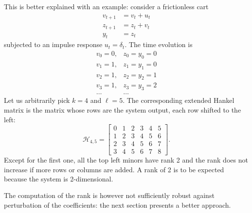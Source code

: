 This is better explained with an example: consider a frictionless cart
\begin{equation*}
  \begin{aligned}
    v_{t+1} &= v_t + u_t \\
    z_{t+1} &= z_t + v_t \\
    y_t &= z_t
  \end{aligned}
\end{equation*}
subjected to an impulse response $u_t=\delta_t$. The time evolution is
\begin{equation*}
  \begin{matrix}
    v_0 = 0, & z_0 = y_0 = 0 \\
    v_1 = 1, & z_1 = y_1 = 0 \\
    v_2 = 1, & z_2 = y_2 = 1 \\
    v_3 = 1, & z_3 = y_3 = 2 \\
    \ldots & \ldots
  \end{matrix}
\end{equation*}
Let us arbitrarily pick $k=4$ and $\ell=5$. The corresponding extended Hankel matrix is the matrix whose rows are the system output, each row shifted to the left:
\begin{equation*}
  \mathcal{H}_{4,5} =
  \begin{bmatrix}
    0 & 1 & 2 & 3 & 4 & 5 \\
    1 & 2 & 3 & 4 & 5 & 6 \\
    2 & 3 & 4 & 5 & 6 & 7 \\
    3 & 4 & 5 & 6 & 7 & 8
  \end{bmatrix}.
\end{equation*}
Except for the first one, all the top left minors have rank 2 and the rank does not increase if more rows or columns are added. A rank of 2 is to be expected because the system is 2-dimensional.

The computation of the rank is however not sufficiently robust against perturbation of the coefficients: the next section presents a better approach.




